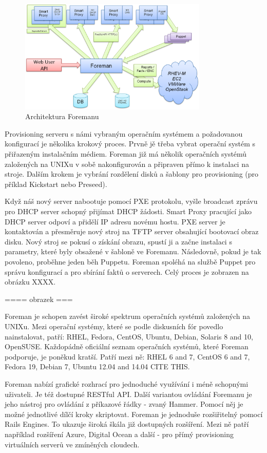 \documentclass[thesis=B,czech]{FITthesis}[2012/06/26]
\begin{document}
\begin{figure}[h]\centering
\includegraphics[width=0.8\textwidth]{files/foreman_architecture.png}
	\caption{Architektura Foremanu}\label{fig:float}
\end{figure}


Provisioning serveru s námi vybraným operačním systémem a požadovanou konfigurací je několika krokový proces. Prvně jě třeba vybrat operační systém s přiřazeným instalačním médiem. Foreman již má několik operačních systémů založených na UNIXu v sobě nakonfigurován a připraven přímo k instalaci na stroje. Dalším krokem je vybrání rozdělení disků a šablony pro provisioning (pro příklad Kickstart nebo Preseed).

Když náš nový server nabootuje pomocí PXE protokolu, vyšle broadcast zprávu pro DHCP server schopný přijímat DHCP žádosti. Smart Proxy pracující jako DHCP server odpoví a přidělí IP adresu novému hostu. PXE server je kontaktován a přesměruje nový stroj na TFTP server obsahující bootovací obraz disku. Nový stroj se pokusí o získání obrazu, spustí ji a začne instalaci s parametry, které byly obsažené v šabloně ve Foremanu. Následovně, pokud je tak povoleno, proběhne jeden běh Puppetu. Foreman spoléhá na službě Puppet pro správu konfigurací a pro sbírání faktů o serverech. Celý proces je zobrazen na obrázku XXXX.

==== obrazek ===

Foreman je schopen zavést široké spektrum operačních systémů založených na UNIXu. Mezi operační systémy, které se podle diskusních fór povedlo nainstalovat, patří: RHEL, Fedora, CentOS, Ubuntu, Debian, Solaris 8 and 10, OpenSUSE. Každopádně oficiální seznam operačních systémů, které Foreman podporuje, je poněkud kratší. Patří mezi ně: RHEL 6 and 7, CentOS 6 and 7, Fedora 19, Debian 7, Ubuntu 12.04 and 14.04 CITE THIS.

Foreman nabízí grafické rozhrací pro jednoduché využívání i méně schopnými uživateli. Je též dostupné RESTful API. Další variantou ovládání Foremanu je jeho nástroj pro ovládání z příkazové řádky - zvaný Hammer. Pomocí něj je možné jednotlivé dílčí kroky skriptovat. Foreman je jednoduše rozšiřitelný pomocí Rails Engines. To ukazuje široká škála již dostupných rozšíření. Mezi ně patří například rozšíření Azure, Digital Ocean a další - pro přímý provisioning virtuálních serverů ve zmíněných cloudech.
\end{document}
